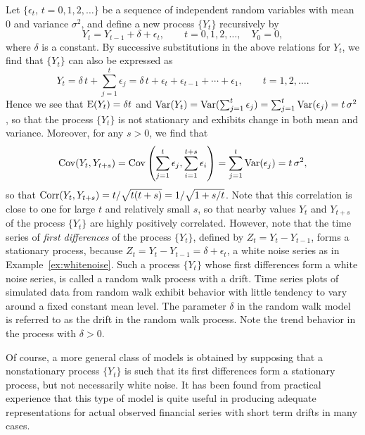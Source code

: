 \begin{ex} \label{ex:driftwalk} 
Let $\{ \epsilon_t, \, t=0,1,2, \ldots \}$ be a sequence of independent random variables with mean 0 and variance $\sigma^2$, and define a new process $\{ Y_t \}$ recursively by
	\[
	Y_t = Y_{t-1} + \delta + \epsilon_t, \qquad t=0,1,2, \ldots, \quad Y_0 = 0,
	\]
where $\delta$ is a constant.  By successive substitutions in the above relations for $Y_t$, we find that $\{Y_t\}$ can also be expressed as
	\[
	Y_t = \delta \, t + \sum_{j=1}^t \epsilon_j = \delta \, t + \epsilon_{t} + \epsilon_{t-1} + \cdots + \epsilon_{1}, \qquad t= 1, 2, \ldots .
	\]
Hence we see that $\operatorname{E}(Y_t)= \delta t$ and $\operatorname{Var}(Y_t)= \operatorname{Var}(\sum_{j=1}^t \epsilon_j)= \sum_{j=1}^t \operatorname{Var}(\epsilon_j)= t \, \sigma^2$, so that the process $\{ Y_t \}$ is not stationary and exhibits change in both mean and variance.  Moreover, for any $s > 0$, we find that
	\[
	\operatorname{Cov}(Y_t,Y_{t+s})= \operatorname{Cov} \left( \sum_{j=1}^t \epsilon_j, \sum_{i=1}^{t+s} \epsilon_i \right)= \sum_{j=1}^t \operatorname{Var}(\epsilon_j) = t \, \sigma^2 ,
	\]
so that $\operatorname{Corr}(Y_t,Y_{t + s}) = t / \sqrt{t(t + s)} = 1/ \sqrt{1 + s/t}$. Note that this correlation is close to one for large $t$ and relatively small $s$, so that nearby values $Y_t$ and $Y_{t+s}$ of the process $\{Y_t\}$ are highly positively correlated.  However, note that the time series of \emph{first differences} of the process $\{ Y_t \}$, defined by $Z_{t}=Y_{t}-Y_{t-1}$, forms a stationary process, because $Z_{t}= Y_{t} - Y_{t-1} = \delta + \epsilon_t$, a white noise series as in Example~\ref{ex:whitenoise}. Such a process $\{ Y_t \}$ whose first differences form a white noise series, is called a random walk process with a drift. Time series plots of simulated data from random walk exhibit behavior with little tendency to vary around a fixed constant mean level. The parameter $\delta$ in the random walk model is referred to as the drift in the random walk process. Note the trend behavior in the process with $\delta > 0$. \xqed
\end{ex}


Of course, a more general class of models is obtained by supposing that a nonstationary process $\{ Y_t \}$ is such that its first differences form a stationary process, but not necessarily white noise.  It has been found from practical experience that this type of model is quite useful in producing adequate representations for actual observed financial series with short term drifts in many cases.



